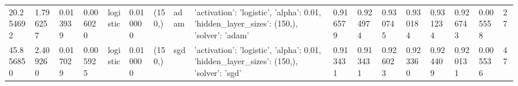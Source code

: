 \documentclass[a1paper]{article}  %
\begin{document}
\begin{landscape}
\begin{tabular}{lllllllllllllllll}
		20.254692 & 1.796257 & 0.013939 & 0.006020 & logistic & 0.010000 & (150,) & adam & {'activation': 'logistic', 'alpha': 0.01, 'hidden\_layer\_sizes': (150,), 'solver': 'adam'} & 0.916579 & 0.924974 & 0.930745 & 0.930184 & 0.931234 & 0.926743 & 0.005558 & 27 \\
		45.856850 & 2.409260 & 0.017029 & 0.005925 & logistic & 0.010000 & (150,) & sgd & {'activation': 'logistic', 'alpha': 0.01, 'hidden\_layer\_sizes': (150,), 'solver': 'sgd'} & 0.913431 & 0.913431 & 0.926023 & 0.923360 & 0.924409 & 0.920131 & 0.005536 & 47 \\
		\bottomrule
	\end{tabular}
\end{landscape}
	
\end{document}
